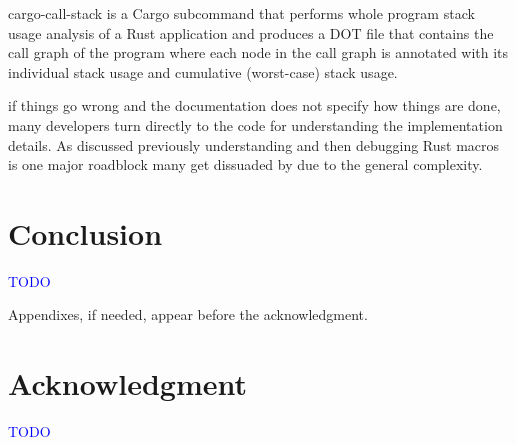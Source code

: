 \documentclass{ieeeaccess}
\begin{document}
cargo-call-stack is a Cargo subcommand that performs whole program stack usage analysis of a Rust application and produces a DOT file that contains the call graph of the program where each node in the call graph is annotated with its individual stack usage and cumulative (worst-case) stack usage.

if things go wrong and the documentation does not specify how things are done, many developers turn directly to the code for understanding the implementation details. As discussed previously understanding and then debugging Rust macros is one major roadblock many get dissuaded by due to the general complexity.

\section{Conclusion}
\label{sec:conclusion}

\textcolor{blue}{TODO}

\appendices

Appendixes, if needed, appear before the acknowledgment.

\section*{Acknowledgment}

\textcolor{blue}{TODO}
\end{document}

